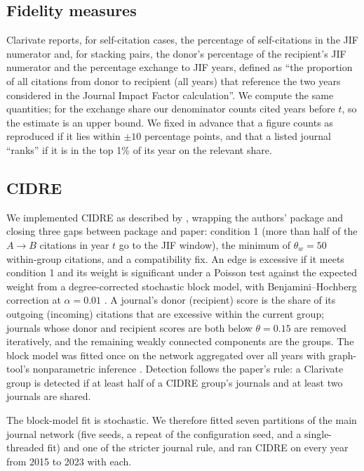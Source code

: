\subsection{Fidelity measures}
Clarivate reports, for self-citation cases, the percentage of self-citations in the JIF numerator and, for stacking
pairs, the donor's percentage of the recipient's JIF numerator and the percentage exchange to JIF years, defined as
``the proportion of all citations from donor to recipient (all years) that reference the two years considered in the
Journal Impact Factor calculation''. We compute the same quantities; for the exchange share our denominator counts
cited years before $t$, so the estimate is an upper bound. We fixed in advance that a figure counts as reproduced if it lies within $\pm10$ percentage points,
and that a listed journal ``ranks'' if it is in the top 1\% of its year on the relevant share.

\subsection{CIDRE}
We implemented CIDRE as described by \citet{kojaku2021cidre}, wrapping the authors' package and closing
three gaps between package and paper: condition 1 (more than half of the $A\!\to\!B$ citations in year $t$ go to the
JIF window), the minimum of $\theta_w=50$ within-group citations, and a compatibility fix. An edge is excessive if it
meets condition 1 and its weight is significant under a Poisson test against the expected weight from a
degree-corrected stochastic block model, with Benjamini--Hochberg correction at $\alpha=0.01$
\citep{benjamini1995}. A journal's donor (recipient) score is the share of its outgoing (incoming) citations that are
excessive within the current group; journals whose donor and recipient scores are both below $\theta=0.15$ are
removed iteratively, and the remaining weakly connected components are the groups. The block model was fitted once on
the network aggregated over all years with graph-tool's nonparametric inference
\citep{peixoto2017nonparametric,peixoto2014graphtool}. Detection follows the paper's rule: a Clarivate group is detected
if at least half of a CIDRE group's journals and at least two journals are shared.

The block-model fit is stochastic. We therefore fitted seven partitions of the main journal network (five seeds, a
repeat of the configuration seed, and a single-threaded fit) and one of the stricter journal rule, and ran CIDRE on
every year from 2015 to 2023 with each.


